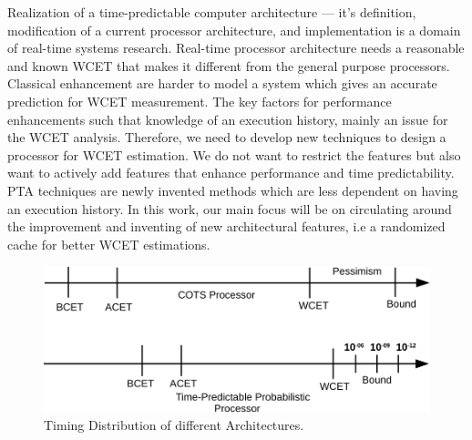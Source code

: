 Realization of a time-predictable computer architecture --- it's definition, modification of a current processor architecture, and implementation is a domain of real-time systems research. Real-time processor architecture needs a reasonable and known WCET that makes it different from the general purpose processors. Classical enhancement are harder to model a system which gives an accurate prediction for WCET measurement. The key factors for performance enhancements such that knowledge of an execution history,  mainly an issue for the WCET analysis. Therefore, we need to develop new techniques to design a processor for WCET estimation. We do not want to restrict the features but also want to actively add features that enhance performance and time predictability. PTA techniques are newly invented methods which are less dependent on having an execution history. In this work, our main focus will be on circulating around the improvement and inventing of new architectural features, i.e a randomized cache for better WCET estimations.

\begin{figure}[tb!]

 \centering
   \includegraphics[scale=1.0]{figures/tpc-thesis.pdf}
   \caption{Timing Distribution of different Architectures.}
\label{fig:tpc1}
\end{figure}





